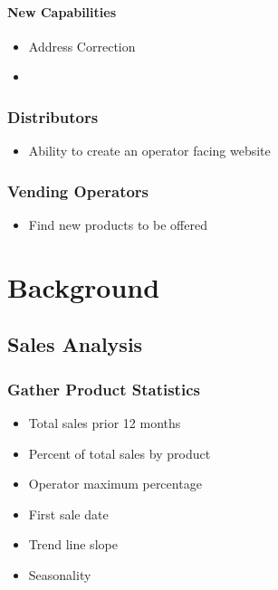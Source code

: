 \documentclass[letterpaper,10pt,english]{sphinxmanual}
\begin{document}
\subsubsection{New Capabilities}
\label{\detokenize{index:new-capabilities}}\begin{itemize}
\item {} 
Address Correction

\item {} 
\end{itemize}


\subsection{Distributors}
\label{\detokenize{index:distributors}}\begin{itemize}
\item {} 
Ability to create an operator facing website

\end{itemize}


\subsection{Vending Operators}
\label{\detokenize{index:vending-operators}}\begin{itemize}
\item {} 
Find new  products to be offered

\end{itemize}


\chapter{Background}
\label{\detokenize{index:background}}

\section{Sales Analysis}
\label{\detokenize{Analyze:sales-analysis}}\label{\detokenize{Analyze::doc}}

\subsection{Gather Product Statistics}
\label{\detokenize{Analyze:gather-product-statistics}}\begin{itemize}
\item {} 
Total sales prior 12 months

\item {} 
Percent of total sales by product

\item {} 
Operator maximum percentage

\item {} 
First sale date

\item {} 
Trend line slope

\item {} 
Seasonality

\end{itemize}
\end{document}
